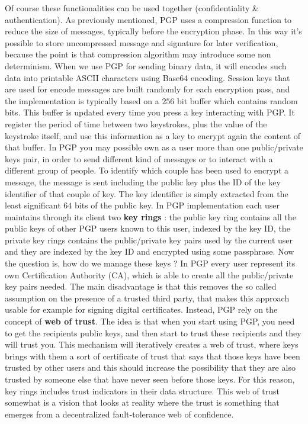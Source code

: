 Of course these functionalities can be used together (confidentiality \& authentication). As previously mentioned, PGP uses a compression function to reduce the size of messages, typically before the encryption phase. In this way it's possible to store uncompressed message and signature for later verification, because the point is that compression algorithm may introduce some non determinism. When we use PGP for sending binary data, it will encodes such data into printable ASCII characters using Base64 encoding. Session keys that are used for encode messages are built randomly for each encryption pass, and the implementation is typically based on a $256$ bit buffer which contains random bits. This buffer is updated every time you press a key interacting with PGP. It register the period of time between two keystrokes, plus the value of the keystroke itself, and use this information as a key to encrypt again the content of that buffer. In PGP you may possible own as a user more than one public/private keys pair, in order to send different kind of messages or to interact with a different group of people. To identify which couple has been used to encrypt a message, the message is sent including the public key plus the ID of the key identifier of that couple of key. The key identifier is simply extracted from the least significant $64$ bits of the public key. In PGP implementation each user maintains through its client two \textbf{key rings} : the public key ring contains all the public keys of other PGP users known to this user, indexed by the key ID, the private key rings contains the public/private key pairs used by the current user and they are indexed by the key ID and encrypted using some passphrase. Now the question is, how do we manage these keys ? In PGP every user represent its own Certification Authority (CA), which is able to create all the public/private key pairs needed. The main disadvantage is that this removes the so called assumption on the presence of a trusted third party, that makes this approach usable for example for signing digital certificates. Instead, PGP rely on the concept of \textbf{web of trust}. The idea is that when you start using PGP, you need to get the recipients public keys, and then start to trust these recipients and they will trust you. This mechanism will iteratively creates a web of trust, where keys brings with them a sort of certificate of trust that says that those keys have been trusted by other users and this should increase the possibility that they are also trusted by someone else that have never seen before those keys. For this reason, key rings includes trust indicators in their data structure. This web of trust somewhat is a vision that looks at reality where the trust is something that emerges from a decentralized fault-tolerance web of confidence.


